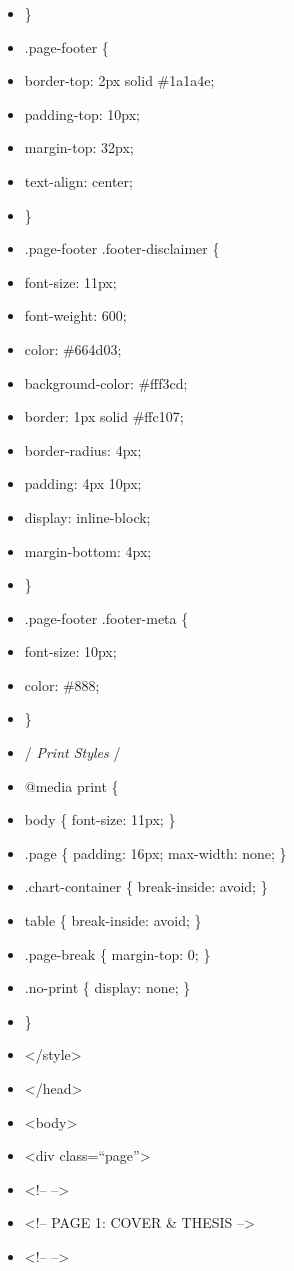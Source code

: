 \documentclass[11pt]{article}
\begin{document}
\begin{itemize}[leftmargin=*,itemsep=2pt,topsep=2pt]
\item {} \}
\item {} .page-footer \{
\item {} border-top: 2px solid \#1a1a4e;
\item {} padding-top: 10px;
\item {} margin-top: 32px;
\item {} text-align: center;
\item {} \}
\item {} .page-footer .footer-disclaimer \{
\item {} font-size: 11px;
\item {} font-weight: 600;
\item {} color: \#664d03;
\item {} background-color: \#fff3cd;
\item {} border: 1px solid \#ffc107;
\item {} border-radius: 4px;
\item {} padding: 4px 10px;
\item {} display: inline-block;
\item {} margin-bottom: 4px;
\item {} \}
\item {} .page-footer .footer-meta \{
\item {} font-size: 10px;
\item {} color: \#888;
\item {} \}
\item {} /\emph{ Print Styles }/
\item {} @media print \{
\item {} body \{ font-size: 11px; \}
\item {} .page \{ padding: 16px; max-width: none; \}
\item {} .chart-container \{ break-inside: avoid; \}
\item {} table \{ break-inside: avoid; \}
\item {} .page-break \{ margin-top: 0; \}
\item {} .no-print \{ display: none; \}
\item {} \}
\item {} </style>
\item {} </head>
\item {} <body>
\item {} <div class=``page''>
\item {} <!-- -->
\item {} <!-- PAGE 1: COVER \& THESIS -->
\item {} <!-- -->

\end{itemize}
\end{document}
